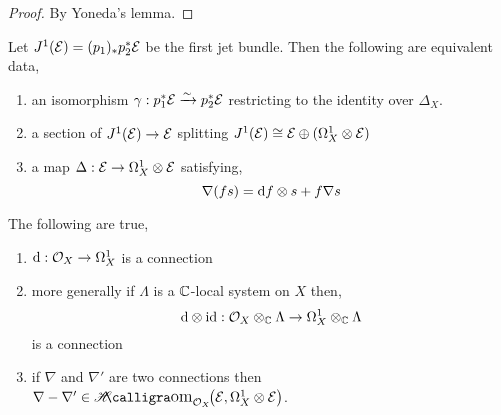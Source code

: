 \documentclass[12pt]{article}
\begin{document}
\begin{proof}
By Yoneda's lemma.
\end{proof}

\begin{prop}
Let $J^1(\mathcal{E}) = (p_1)_* p_2^* \mathcal{E}$ be the first jet bundle. Then the following are equivalent data,
\begin{enumerate}
\item an isomorphism $\gamma : p_1^* \mathcal{E} \xrightarrow{\sim} p_2^* \mathcal{E}$ restricting to the identity over $\Delta_X$. 
\item a section of $J^1(\mathcal{E}) \to \mathcal{E}$ splitting $J^1(\mathcal{E}) \cong \mathcal{E} \oplus (\Omega^1_X \otimes \mathcal{E})$
\item a map $\Delta : \mathcal{E} \to \Omega^1_X \otimes \mathcal{E}$ satisfying,
\[ \nabla (fs) = \mathrm{d}{f} \otimes s + f \nabla s \]
\end{enumerate}
\end{prop}

\begin{prop}
The following are true,
\begin{enumerate}
\item $\mathrm{d} : \mathcal{O}_{X} \to \Omega^1_X$ is a connection
\item more generally if $\Lambda$ is a $\mathbb{C}$-local system on $X$ then,
\[ \mathrm{d} \otimes \mathrm{id} : \mathcal{O}_{X} \otimes_{\mathbb{C}} \Lambda \to \Omega^1_X \otimes_{\mathbb{C}} \Lambda \]
is a connection
\item if $\nabla$ and $\nabla'$ are two connections then $\nabla - \nabla' \in \shHom{\struct{X}}{\E}{\Omega_X^1 \ot \E}$. 
\end{enumerate}
\end{prop}
\end{document}
